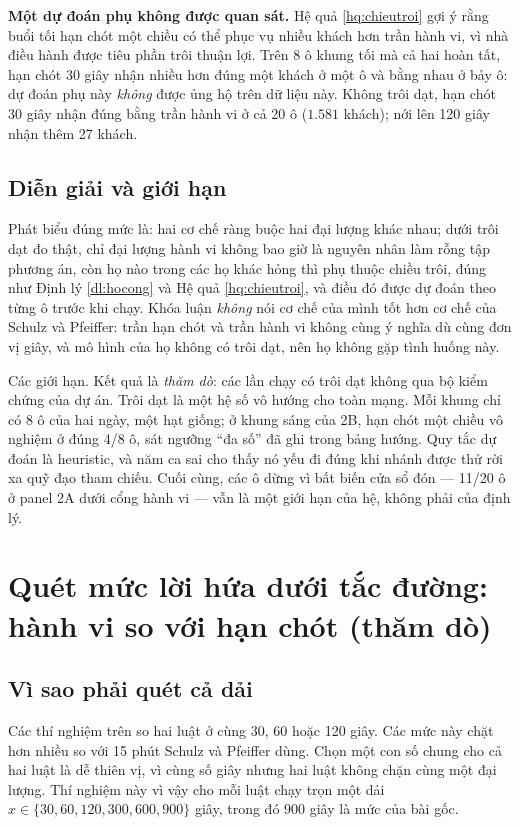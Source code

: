 \textbf{Một dự đoán phụ không được quan sát.} Hệ quả \ref{hq:chieutroi} gợi ý rằng buổi tối hạn chót
một chiều có thể phục vụ nhiều khách hơn trần hành vi, vì nhà điều hành được tiêu phần trôi thuận
lợi. Trên 8 ô khung tối mà cả hai hoàn tất, hạn chót 30 giây nhận nhiều hơn đúng một khách ở một ô và
bằng nhau ở bảy ô: dự đoán phụ này \emph{không} được ủng hộ trên dữ liệu này. Không trôi dạt, hạn chót
30 giây nhận đúng bằng trần hành vi ở cả 20 ô ($1.581$ khách); nới lên 120 giây nhận thêm 27 khách.

\subsection{Diễn giải và giới hạn}

Phát biểu đúng mức là: hai cơ chế ràng buộc hai đại lượng khác nhau; dưới trôi dạt đo thật, chỉ đại
lượng hành vi không bao giờ là nguyên nhân làm rỗng tập phương án, còn họ nào trong các họ khác hỏng
thì phụ thuộc chiều trôi, đúng như Định lý \ref{dl:hocong} và Hệ quả \ref{hq:chieutroi}, và điều đó
được dự đoán theo từng ô trước khi chạy. Khóa luận \emph{không} nói cơ chế của mình tốt hơn cơ chế của
Schulz và Pfeiffer: trần hạn chót và trần hành vi không cùng ý nghĩa dù cùng đơn vị giây, và mô hình
của họ không có trôi dạt, nên họ không gặp tình huống này.

Các giới hạn. Kết quả là \emph{thăm dò}: các lần chạy có trôi dạt không qua bộ kiểm chứng của dự án.
Trôi dạt là một hệ số vô hướng cho toàn mạng. Mỗi khung chỉ có 8 ô của hai ngày, một hạt giống; ở
khung sáng của 2B, hạn chót một chiều vô nghiệm ở đúng 4/8 ô, sát ngưỡng ``đa số'' đã ghi trong bảng
hướng. Quy tắc dự đoán là heuristic, và năm ca sai cho thấy nó yếu đi đúng khi nhánh được thử rời xa
quỹ đạo tham chiếu. Cuối cùng, các ô dừng vì bất biến cửa sổ đón --- 11/20 ô ở panel 2A dưới cổng hành
vi --- vẫn là một giới hạn của hệ, không phải của định lý.

\section{Quét mức lời hứa dưới tắc đường: hành vi so với hạn chót (thăm dò)}
\label{muc:quet}

\subsection{Vì sao phải quét cả dải}

Các thí nghiệm trên so hai luật ở cùng 30, 60 hoặc 120 giây. Các mức này chặt hơn nhiều so với 15 phút
Schulz và Pfeiffer dùng. Chọn một con số chung cho cả hai luật là dễ thiên vị, vì cùng số giây nhưng
hai luật không chặn cùng một đại lượng. Thí nghiệm này vì vậy cho mỗi luật chạy trọn một dải
$x \in \{30, 60, 120, 300, 600, 900\}$ giây, trong đó 900 giây là mức của bài gốc.

